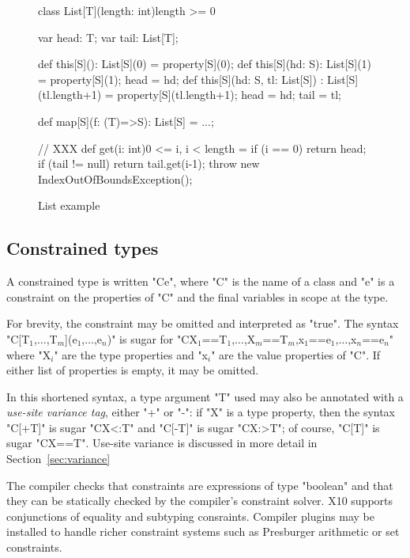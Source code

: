 \documentclass[preprint,nocopyrightspace,9pt]{sigplanconf}
\begin{document}
\begin{figure}
\begin{xtennoindent}
class List[T](length: int){length >= 0} {
    var head: T;
    var tail: List[T];

    def this[S](): List[S](0) = property[S](0);
    def this[S](hd: S): List[S](1) = {
        property[S](1); head = hd;
    }
    def this[S](hd: S, tl: List[S])
        : List[S](tl.length+1) = {
        property[S](tl.length+1);
        head = hd; tail = tl;
    }

    def map[S](f: (T)=>S): List[S] = ...;

    // XXX
    def get(i: int){0 <= i, i < length} = {
        if (i == 0) return head;
        if (tail != null) return tail.get(i-1);
        throw new IndexOutOfBoundsException();
    }
}
\end{xtennoindent}
\caption{List example}
\label{fig:list}
\end{figure}

\subsection{Constrained types}

A constrained type is written \xcd"C{e}", where \xcd"C" is the
name of a class and \xcd"e" is a constraint on the
properties of \xcd"C" and the final variables in scope at the
type.  

For brevity, the constraint may be omitted and
interpreted as \xcd"true".
The syntax
\xcdmath"C[T$_1$,$\dots$,T$_m$](e$_1$,$\dots$,e$_n$)" is sugar for
\xcdmath"C{X$_1$==T$_1$,$\dots$,X$_m$==T$_m$,x$_1$==e$_1$,$\dots$,x$_n$==e$_n$}"
where \xcd"X$_i$" are the type properties and \xcd"x$_i$" are the
value properties of \xcd"C".
If either list of properties is empty, it may be omitted.

In this shortened syntax, a type argument \xcd"T" used may also
be annotated
with
a \emph{use-site variance tag}, either \xcd"+" or \xcd"-":
if \xcd"X" is a type property, then
the syntax \xcd"C[+T]" is sugar \xcd"C{X<:T}" and
\xcd"C[-T]" is sugar \xcd"C{X:>T}"; of course,
\xcd"C[T]" is sugar \xcd"C{X==T}".
Use-site variance is discussed in more detail in
Section~\ref{sec:variance}

The compiler checks that constraints are expressions
of type \xcd"boolean" and that they can be statically checked by
the compiler's constraint solver.  X10 supports conjunctions of equality and
subtyping consraints.  Compiler plugins may be installed to
handle richer constraint systems such as Presburger arithmetic
or set constraints.
\end{document}
